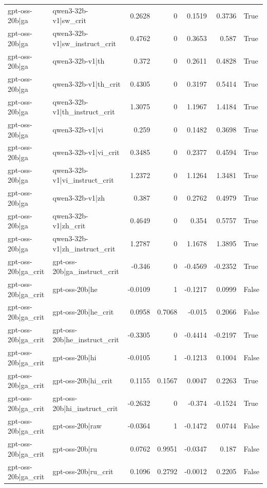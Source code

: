 \begin{table}
\begin{tabular}{l l r r r r l}
gpt-oss-20b|ga & qwen3-32b-v1|sw_crit & 0.2628 & 0 & 0.1519 & 0.3736 & True \\
gpt-oss-20b|ga & qwen3-32b-v1|sw_instruct_crit & 0.4762 & 0 & 0.3653 & 0.587 & True \\
gpt-oss-20b|ga & qwen3-32b-v1|th & 0.372 & 0 & 0.2611 & 0.4828 & True \\
gpt-oss-20b|ga & qwen3-32b-v1|th_crit & 0.4305 & 0 & 0.3197 & 0.5414 & True \\
gpt-oss-20b|ga & qwen3-32b-v1|th_instruct_crit & 1.3075 & 0 & 1.1967 & 1.4184 & True \\
gpt-oss-20b|ga & qwen3-32b-v1|vi & 0.259 & 0 & 0.1482 & 0.3698 & True \\
gpt-oss-20b|ga & qwen3-32b-v1|vi_crit & 0.3485 & 0 & 0.2377 & 0.4594 & True \\
gpt-oss-20b|ga & qwen3-32b-v1|vi_instruct_crit & 1.2372 & 0 & 1.1264 & 1.3481 & True \\
gpt-oss-20b|ga & qwen3-32b-v1|zh & 0.387 & 0 & 0.2762 & 0.4979 & True \\
gpt-oss-20b|ga & qwen3-32b-v1|zh_crit & 0.4649 & 0 & 0.354 & 0.5757 & True \\
gpt-oss-20b|ga & qwen3-32b-v1|zh_instruct_crit & 1.2787 & 0 & 1.1678 & 1.3895 & True \\
gpt-oss-20b|ga_crit & gpt-oss-20b|ga_instruct_crit & -0.346 & 0 & -0.4569 & -0.2352 & True \\
gpt-oss-20b|ga_crit & gpt-oss-20b|he & -0.0109 & 1 & -0.1217 & 0.0999 & False \\
gpt-oss-20b|ga_crit & gpt-oss-20b|he_crit & 0.0958 & 0.7068 & -0.015 & 0.2066 & False \\
gpt-oss-20b|ga_crit & gpt-oss-20b|he_instruct_crit & -0.3305 & 0 & -0.4414 & -0.2197 & True \\
gpt-oss-20b|ga_crit & gpt-oss-20b|hi & -0.0105 & 1 & -0.1213 & 0.1004 & False \\
gpt-oss-20b|ga_crit & gpt-oss-20b|hi_crit & 0.1155 & 0.1567 & 0.0047 & 0.2263 & True \\
gpt-oss-20b|ga_crit & gpt-oss-20b|hi_instruct_crit & -0.2632 & 0 & -0.374 & -0.1524 & True \\
gpt-oss-20b|ga_crit & gpt-oss-20b|raw & -0.0364 & 1 & -0.1472 & 0.0744 & False \\
gpt-oss-20b|ga_crit & gpt-oss-20b|ru & 0.0762 & 0.9951 & -0.0347 & 0.187 & False \\
gpt-oss-20b|ga_crit & gpt-oss-20b|ru_crit & 0.1096 & 0.2792 & -0.0012 & 0.2205 & False \\

\end{tabular}
\end{table}
